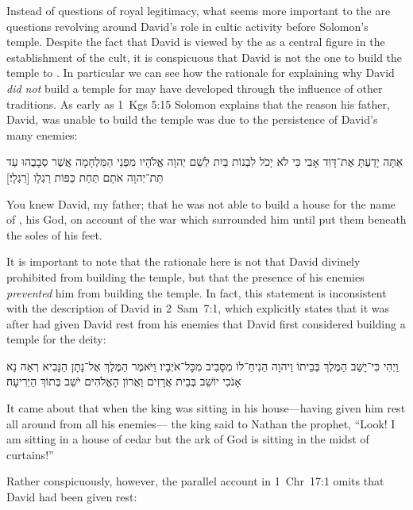 Instead of questions of royal legitimacy, what seems more important to the \chronicler are questions revolving around David's role in cultic activity before Solomon's temple. Despite the fact that David is viewed by the \chronicler as a central figure in the establishment of the cult, it is conspicuous that David is not the one to build the temple to \yahweh. In particular we can see how the rationale for explaining why David \emph{did not} build a temple for \yahweh may have developed through the influence of other traditions. As early as 1~Kgs 5:15 Solomon explains that the reason his father, David, was unable to build the temple was due to the persistence of David's many enemies:
\begin{hebrewtext}
    אַתָּה יָדַעְתָּ אֶת־דָּוִד אָבִי כִּי לֹא יָכֹל לִבְנוֹת בַּיִת לְשֵׁם יְהוָה אֱלֹהָיו מִפְּנֵי הַמִּלְחָמָה אֲשֶׁר סְבָבֻהוּ עַד תֵּת־יְהוָה אֹתָם תַּחַת כַּפּוֹת רַגְלָו [רַגְלָי׃] 
\end{hebrewtext}
\begin{translation}
    You knew David, my father; that he was not able to build a house for the name of \yahweh, his God, on account of the war which surrounded him until \yahweh put them beneath the soles of his feet.
\end{translation}
\noindent
It is important to note that the rationale here is not that David divinely prohibited from building the temple, but that the presence of his enemies \emph{prevented} him from building the temple. In fact, this statement is inconsistent with the description of David in 2~Sam~7:1, which explicitly states that it was after \yahweh had given David rest from his enemies that David first considered building a temple for the deity:
    \begin{hebrewtext}
        וַיְהִי כִּי־יָשַׁב הַמֶּלֶךְ בְּבֵיתוֹ וַיהוָה הֵנִיחַ־לוֹ מִסָּבִיב מִכָּל־אֹיְבָיו׃
        וַיֹּאמֶר הַמֶּלֶךְ אֶל־נָתָן הַנָּבִיא רְאֵה נָא אָנֹכִי יוֹשֵׁב בְּבֵית אֲרָזִים וַאֲרוֹן הָאֱלֹהִים יֹשֵׁב בְּתוֹךְ הַיְרִיעָה׃
    \end{hebrewtext}
    \begin{translation}
        It came about that when the king was sitting in his house---\yahweh having given him rest all around from all his enemies---
        the king said to Nathan the prophet, ``Look! I am sitting in a house of cedar but the ark of God is sitting in the midst of curtains!''
    \end{translation}
\noindent
Rather conspicuously, however, the parallel account in 1~Chr~17:1 omits that David had been given rest:
